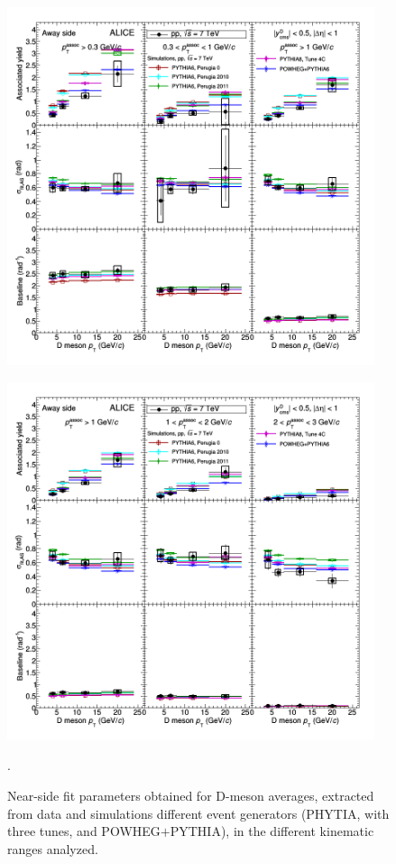 \begin{figure}[h]
\centering
\includegraphics[width=0.96\textwidth]{figures/CfrPPandModels/ComparePPtoMCFitResultsAS.png}
\end{figure}
\begin{figure}[h]
\centering
\includegraphics[width=0.96\textwidth]{figures/CfrPPandModels/ComparePPtoMCFitResultsAS_2.png}
\caption{Near-side fit parameters obtained for D-meson averages, extracted from data and simulations different event generators (PHYTIA, with three tunes, and POWHEG$+$PYTHIA), in the different kinematic ranges analyzed.}.
\label{pp-models}
\end{figure}

